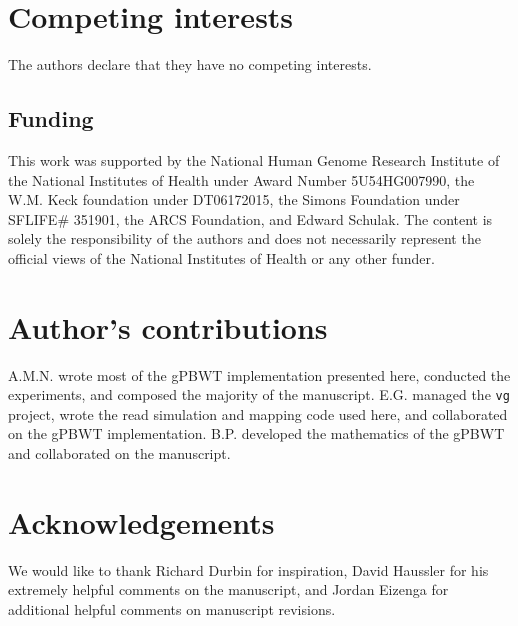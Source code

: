 \section{Competing interests}
The authors declare that they have no competing interests.

\subsection{Funding}
This work was supported by the National Human Genome Research Institute of the National Institutes of Health under Award Number 5U54HG007990, the W.M. Keck foundation under DT06172015, the Simons Foundation under SFLIFE\# 351901, the ARCS Foundation, and Edward Schulak. The content is solely the responsibility of the authors and does not necessarily represent the official views of the National Institutes of Health or any other funder.

\section{Author's contributions}
    A.M.N. wrote most of the gPBWT implementation presented here, conducted the experiments, and composed the majority of the manuscript. E.G. managed the \texttt{vg} project, wrote the read simulation and mapping code used here, and collaborated on the gPBWT implementation. B.P. developed the mathematics of the gPBWT and collaborated on the manuscript.

\section{Acknowledgements}
We would like to thank Richard Durbin for inspiration, David Haussler for his extremely helpful comments on the manuscript, and Jordan Eizenga for additional helpful comments on manuscript revisions.

